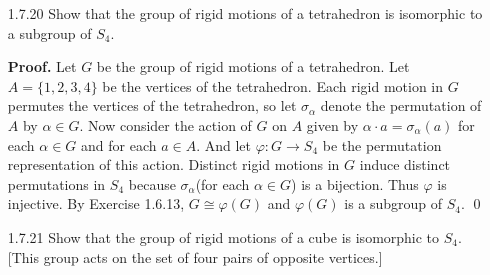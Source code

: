\begin{enumerate}
      \textbf{Proof.} Let $x \in G$ and let $\mathcal{O}$ be the orbit of $x$
      under the action of $H$ on $G$. Consider the map
      $\alpha : H \rightarrow \mathcal{O}$, $h \mapsto hx$. Suppose
      $\alpha(a) = \alpha(b)$. Then it follows that $ax = bx$, so that $a = b$,
      by cancellation. Thus $\alpha$ is injective. Since $G$ is finite, $H$
      must also be finite; thus $\alpha$ is necessarily surjective, and we 
      conclude that $\alpha$ is bijective. That is $|H| = |\mathcal{O}|$. Let
      $|G| = n$. By Exercise 1.7.18, the action of $H$ on $G$ partitions $G$
      into $m$ distinct orbits (there is a finite number of orbits because $G$
      is finite). Since $x$ was arbitrary, it follows that each orbit of this
      action has size $|H|$, so that $m\cdot|H| = |G|$. That is, $|H| \mid |G|$.
      \qed
   \item[1.7.20]  Show that the group of rigid motions of a tetrahedron is
                  isomorphic to a subgroup of $S_4$.
   
      \textbf{Proof.} Let $G$ be the group of rigid motions of a tetrahedron.
      Let $A = \{1, 2, 3, 4\}$ be the vertices of the tetrahedron. Each rigid
      motion in $G$ permutes the vertices of the tetrahedron, so let
      $\sigma_\alpha$ denote the permutation of $A$ by $\alpha \in G$. Now
      consider the action of $G$ on $A$ given by
      $\alpha \cdot a = \sigma_\alpha(a)$ for each $\alpha \in G$ and for each
      $a \in A$. And let $\varphi : G \rightarrow S_4$ be the permutation 
      representation of this action. Distinct rigid motions in $G$ induce 
      distinct permutations in $S_4$ because $\sigma_\alpha$(for each
      $\alpha \in G$) is a bijection. Thus $\varphi$ is injective. By Exercise 
      1.6.13, $G \cong \varphi(G)$ and $\varphi(G)$ is a subgroup of $S_4$. \qed
   \item[1.7.21]  Show that the group of rigid motions of a cube is isomorphic
                  to $S_4$. [This group acts on the set of four pairs of
                  opposite vertices.]


\end{enumerate}
